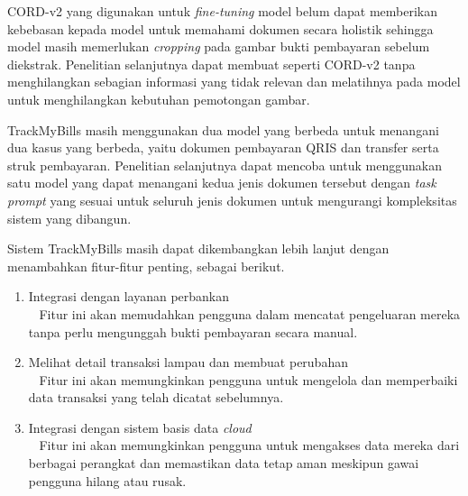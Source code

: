 \datasetfl{} CORD-v2 yang digunakan untuk \emph{fine-tuning} model \donut{} belum dapat memberikan kebebasan kepada model untuk memahami dokumen secara holistik sehingga model masih memerlukan \emph{cropping} pada gambar bukti pembayaran sebelum diekstrak. Penelitian selanjutnya dapat membuat \dataset{} seperti CORD-v2 tanpa menghilangkan sebagian informasi yang tidak relevan dan melatihnya pada model \donut{} untuk menghilangkan kebutuhan pemotongan gambar.

TrackMyBills masih menggunakan dua model yang berbeda untuk menangani dua kasus yang berbeda, yaitu dokumen pembayaran QRIS dan transfer serta struk pembayaran. Penelitian selanjutnya dapat mencoba untuk menggunakan satu model yang dapat menangani kedua jenis dokumen tersebut dengan \emph{task prompt} yang sesuai untuk seluruh jenis dokumen untuk mengurangi kompleksitas sistem yang dibangun.

Sistem TrackMyBills masih dapat dikembangkan lebih lanjut dengan menambahkan fitur-fitur penting, sebagai berikut.
\begin{enumerate}
    \item Integrasi dengan layanan perbankan\\~ Fitur ini akan memudahkan pengguna dalam mencatat pengeluaran mereka tanpa perlu mengunggah bukti pembayaran secara manual.
    \item Melihat detail transaksi lampau dan membuat perubahan\\~ Fitur ini akan memungkinkan pengguna untuk mengelola dan memperbaiki data transaksi yang telah dicatat sebelumnya.
    \item Integrasi dengan sistem basis data \emph{cloud}\\~
    Fitur ini akan memungkinkan pengguna untuk mengakses data mereka dari berbagai perangkat dan memastikan data tetap aman meskipun gawai pengguna hilang atau rusak.
\end{enumerate}